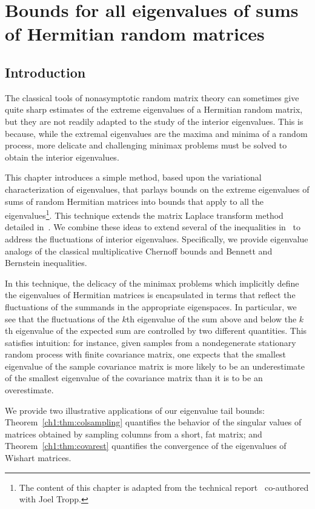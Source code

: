
\chapter{Bounds for all eigenvalues of sums of Hermitian random matrices}
\label{ch1}

\section{Introduction}
\label{ch1:sec:intro}

The classical tools of nonasymptotic random matrix theory can sometimes
give quite sharp estimates of the extreme eigenvalues of a Hermitian random matrix, but
they are not readily adapted to the study of the interior eigenvalues.
This is because, while the extremal eigenvalues are the maxima and minima of a random
process, more delicate and challenging minimax problems must be solved to obtain
the interior eigenvalues.

This chapter introduces a simple method, based upon the variational
characterization of eigenvalues, that parlays bounds on the extreme eigenvalues
of sums of random Hermitian matrices into bounds that apply to all the
eigenvalues\footnote{The content of this chapter is adapted from the technical report~\cite{GT09} co-authored with Joel Tropp.}. 
This technique extends the matrix Laplace transform method
detailed in~\cite{T10a}. 
We combine these ideas to extend several of the
inequalities in~\cite{T10a} to address the fluctuations of interior
eigenvalues. Specifically, we provide eigenvalue analogs of the classical
multiplicative Chernoff bounds
and Bennett and Bernstein inequalities.

In this technique, the delicacy of the minimax problems which implicitly define the eigenvalues
of Hermitian matrices is encapsulated in terms that reflect the fluctuations of the summands in the
appropriate eigenspaces. In particular, we see that the fluctuations of the 
$k$th eigenvalue of the sum above and below the $k$th eigenvalue of the expected 
sum are controlled by two different quantities. This satisfies intuition: for instance,
given samples from a nondegenerate stationary random process with finite covariance 
matrix, one expects that the smallest eigenvalue of the sample covariance matrix is more
likely to be an underestimate of the smallest eigenvalue of the covariance matrix
than it is to be an overestimate.

We provide two illustrative applications of our eigenvalue tail bounds: 
Theorem~\ref{ch1:thm:colsampling} quantifies the behavior of the singular values of 
matrices obtained by sampling columns from a short, fat matrix; and Theorem~\ref{ch1:thm:covarest}
quantifies the convergence of the eigenvalues of Wishart matrices.

